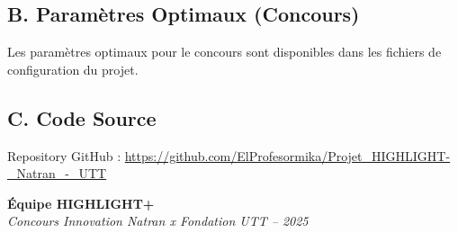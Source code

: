 \documentclass[12pt,a4paper]{article}
\newcommand{\highlight}{\textbf{HIGHLIGHT+}}
\begin{document}
\subsection*{B. Paramètres Optimaux (Concours)}

Les paramètres optimaux pour le concours sont disponibles dans les fichiers de configuration du projet.

\subsection*{C. Code Source}

Repository GitHub : \url{https://github.com/ElProfesormika/Projet_HIGHLIGHT-_Natran_-_UTT}

\vspace{2cm}

\begin{center}
\textbf{Équipe \highlight{}}\\
\textit{Concours Innovation Natran x Fondation UTT -- 2025}
\end{center}
\end{document}
